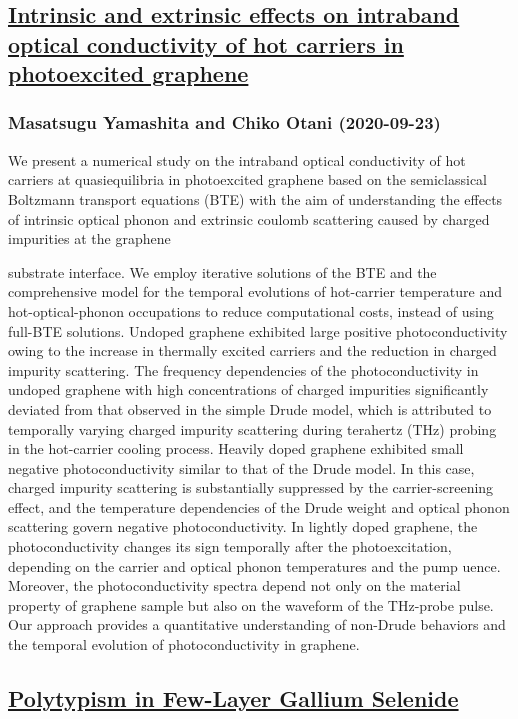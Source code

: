 \subsection*{\href{http://arxiv.org/abs/2009.10960v1}{Intrinsic and extrinsic effects on intraband optical conductivity of hot  carriers in photoexcited graphene}}
\subsubsection*{Masatsugu Yamashita and Chiko Otani (2020-09-23)}
We present a numerical study on the intraband optical conductivity of hot
carriers at quasiequilibria in photoexcited graphene based on the semiclassical
Boltzmann transport equations (BTE) with the aim of understanding the effects
of intrinsic optical phonon and extrinsic coulomb scattering caused by charged
impurities at the graphene{substrate interface. We employ iterative solutions
of the BTE and the comprehensive model for the temporal evolutions of
hot-carrier temperature and hot-optical-phonon occupations to reduce
computational costs, instead of using full-BTE solutions. Undoped graphene
exhibited large positive photoconductivity owing to the increase in thermally
excited carriers and the reduction in charged impurity scattering. The
frequency dependencies of the photoconductivity in undoped graphene with high
concentrations of charged impurities significantly deviated from that observed
in the simple Drude model, which is attributed to temporally varying charged
impurity scattering during terahertz (THz) probing in the hot-carrier cooling
process. Heavily doped graphene exhibited small negative photoconductivity
similar to that of the Drude model. In this case, charged impurity scattering
is substantially suppressed by the carrier-screening effect, and the
temperature dependencies of the Drude weight and optical phonon scattering
govern negative photoconductivity. In lightly doped graphene, the
photoconductivity changes its sign temporally after the photoexcitation,
depending on the carrier and optical phonon temperatures and the pump uence.
Moreover, the photoconductivity spectra depend not only on the material
property of graphene sample but also on the waveform of the THz-probe pulse.
Our approach provides a quantitative understanding of non-Drude behaviors and
the temporal evolution of photoconductivity in graphene.

\subsection*{\href{http://arxiv.org/abs/2009.10954v1}{Polytypism in Few-Layer Gallium Selenide}}
}

